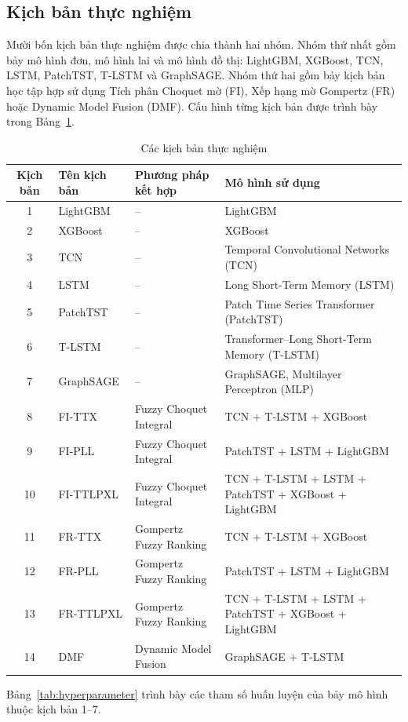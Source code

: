 \documentclass[10pt,twoside]{article}
\begin{document}
\subsection{Kịch bản thực nghiệm}
Mười bốn kịch bản thực nghiệm được chia thành hai nhóm. Nhóm thứ nhất gồm bảy mô hình đơn, mô hình lai và mô hình đồ thị: LightGBM, XGBoost, TCN, LSTM, PatchTST, T-LSTM và GraphSAGE. Nhóm thứ hai gồm bảy kịch bản học tập hợp sử dụng Tích phân Choquet mờ (FI), Xếp hạng mờ Gompertz (FR) hoặc Dynamic Model Fusion (DMF). Cấu hình từng kịch bản được trình bày trong Bảng~\ref{tab:experimental_scenarios}.
\begin{table}[H] 
\centering 
\caption{Các kịch bản thực nghiệm} 
\label{tab:experimental_scenarios} 
\begin{tabular}{c l l >{\raggedright\arraybackslash}p{6.5cm}} 
\hline 
\textbf{Kịch bản} & \textbf{Tên kịch bản} & \textbf{Phương pháp kết hợp} & \textbf{Mô hình sử dụng} \\ \hline 
1 & LightGBM & -- & LightGBM \\ 
2 & XGBoost & -- & XGBoost \\ 
3 & TCN & -- & Temporal Convolutional Networks (TCN) \\ 
4 & LSTM & -- & Long Short-Term Memory (LSTM) \\ 
5 & PatchTST & -- & Patch Time Series Transformer (PatchTST) \\ 
6 & T-LSTM & -- & Transformer--Long Short-Term Memory (T-LSTM) \\ 
7 & GraphSAGE & -- & GraphSAGE, Multilayer Perceptron (MLP) \\ 
8 & FI-TTX & Fuzzy Choquet Integral & TCN + T-LSTM + XGBoost \\ 
9 & FI-PLL & Fuzzy Choquet Integral & PatchTST + LSTM + LightGBM \\ 
10 & FI-TTLPXL & Fuzzy Choquet Integral & TCN + T-LSTM + LSTM + PatchTST + XGBoost + LightGBM \\ 
11 & FR-TTX & Gompertz Fuzzy Ranking & TCN + T-LSTM + XGBoost \\ 
12 & FR-PLL & Gompertz Fuzzy Ranking & PatchTST + LSTM + LightGBM \\ 
13 & FR-TTLPXL & Gompertz Fuzzy Ranking & TCN + T-LSTM + LSTM + PatchTST + XGBoost + LightGBM \\ 
14 & DMF & Dynamic Model Fusion & GraphSAGE + T-LSTM \\ \hline \end{tabular} 
\end{table}
Bảng~\ref{tab:hyperparameter} trình bày các tham số huấn luyện của bảy mô hình thuộc kịch bản 1--7.
\end{document}
